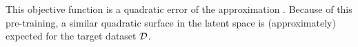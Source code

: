 %
This objective function is a quadratic error of the approximation .
%
%
Because of this pre-training, a similar quadratic surface in the latent space is (approximately) expected for the target dataset ${\mathcal D}$.
